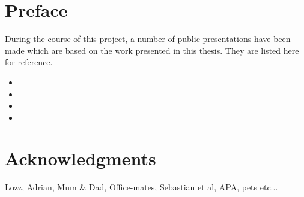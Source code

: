 \chapter*{Preface}
During the course of this project, a number of public presentations have been
 made which are based on the work presented in this thesis. They are listed
 here for reference.


\nobibliography*
\begin{itemize}
\item {}
\item {}
\item {}
\item {}
\end{itemize}


\chapter*{Acknowledgments} %

Lozz, Adrian, Mum \& Dad, Office-mates, Sebastian et al, APA, pets etc...

\singlespace    %
\tableofcontents
\listoftables
\listoffigures

\newpage
{}










\appendix


\singlespace




